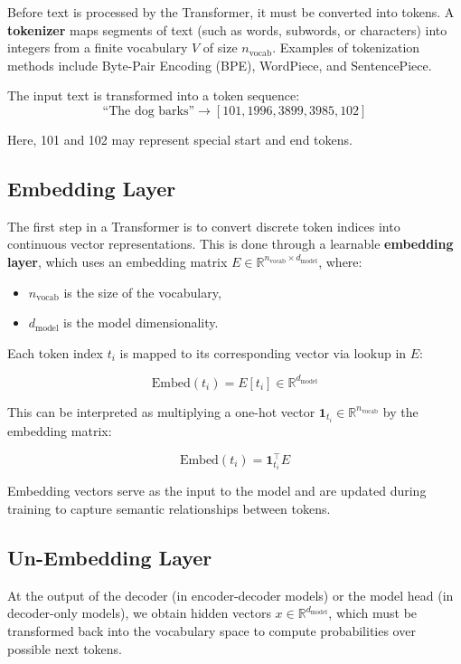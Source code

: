 Before text is processed by the Transformer, it must be converted into tokens. A \textbf{tokenizer} maps segments of text (such as words, subwords, or characters) into integers from a finite vocabulary $V$ of size $n_{\text{vocab}}$. Examples of tokenization methods include Byte-Pair Encoding (BPE), WordPiece, and SentencePiece.

The input text is transformed into a token sequence:
\[
\text{``The dog barks''} \rightarrow [101, 1996, 3899, 3985, 102]
\]

Here, 101 and 102 may represent special start and end tokens.

\subsection{Embedding Layer}

The first step in a Transformer is to convert discrete token indices into continuous vector representations. This is done through a learnable \textbf{embedding layer}, which uses an embedding matrix $E \in \mathbb{R}^{n_{\text{vocab}} \times d_{\text{model}}}$, where:

\begin{itemize}
  \item $n_{\text{vocab}}$ is the size of the vocabulary,
  \item $d_{\text{model}}$ is the model dimensionality.
\end{itemize}

Each token index $t_i$ is mapped to its corresponding vector via lookup in $E$:

\[
\text{Embed}(t_i) = E[t_i] \in \mathbb{R}^{d_{\text{model}}}
\]

This can be interpreted as multiplying a one-hot vector $\mathbf{1}_{t_i} \in \mathbb{R}^{n_{\text{vocab}}}$ by the embedding matrix:

\[
\text{Embed}(t_i) = \mathbf{1}_{t_i}^\top E
\]

Embedding vectors serve as the input to the model and are updated during training to capture semantic relationships between tokens.

\subsection{Un-Embedding Layer}

At the output of the decoder (in encoder-decoder models) or the model head (in decoder-only models), we obtain hidden vectors $x \in \mathbb{R}^{d_{\text{model}}}$, which must be transformed back into the vocabulary space to compute probabilities over possible next tokens.

